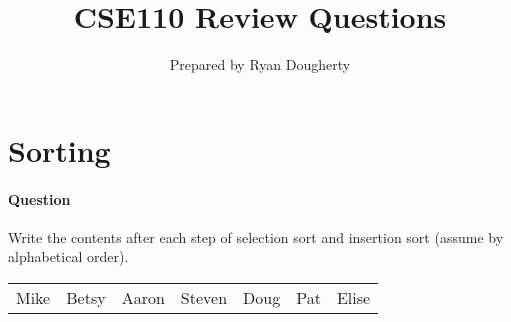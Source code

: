 \documentclass{article}
\title{CSE110 Review Questions}
\author{Prepared by Ryan Dougherty}
\date{}
\begin{document}
\maketitle

\section{Sorting}


\setcounter{question_num}{1}
\paragraph{Question }
Write the contents after each step of selection sort and insertion sort (assume by alphabetical order).
\begin{table}[h]
\begin{tabular}{lllllll}
Mike & Betsy & Aaron & Steven & Doug & Pat & Elise
\end{tabular}
\end{table}
\end{document}
